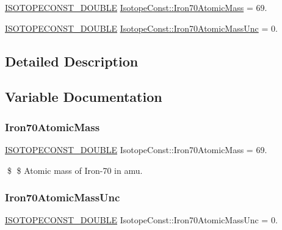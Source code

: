 \begin{DoxyCompactItemize}
\item 
\mbox{\hyperlink{group___isotope_const-_macros_ga8f45a7272ce02c0b4c65c44636ed719a}{I\+S\+O\+T\+O\+P\+E\+C\+O\+N\+S\+T\+\_\+\+D\+O\+U\+B\+LE}} \mbox{\hyperlink{group___isotope_const-_iron-_fe70_gac1929da1a5e26a3717f1ee7388b3af29}{Isotope\+Const\+::\+Iron70\+Atomic\+Mass}} = 69.
\item 
\mbox{\hyperlink{group___isotope_const-_macros_ga8f45a7272ce02c0b4c65c44636ed719a}{I\+S\+O\+T\+O\+P\+E\+C\+O\+N\+S\+T\+\_\+\+D\+O\+U\+B\+LE}} \mbox{\hyperlink{group___isotope_const-_iron-_fe70_gad8564794954d0011aedcecf90f879b61}{Isotope\+Const\+::\+Iron70\+Atomic\+Mass\+Unc}} = 0.
\end{DoxyCompactItemize}


\subsection{Detailed Description}


\subsection{Variable Documentation}
\mbox{\label{group___isotope_const-_iron-_fe70_gac1929da1a5e26a3717f1ee7388b3af29}} 
\subsubsection{\texorpdfstring{Iron70\+Atomic\+Mass}{Iron70AtomicMass}}
{\footnotesize\ttfamily \mbox{\hyperlink{group___isotope_const-_macros_ga8f45a7272ce02c0b4c65c44636ed719a}{I\+S\+O\+T\+O\+P\+E\+C\+O\+N\+S\+T\+\_\+\+D\+O\+U\+B\+LE}} Isotope\+Const\+::\+Iron70\+Atomic\+Mass = 69.}

\$ \$ Atomic mass of Iron-\/70 in amu. \mbox{\label{group___isotope_const-_iron-_fe70_gad8564794954d0011aedcecf90f879b61}} 
\subsubsection{\texorpdfstring{Iron70\+Atomic\+Mass\+Unc}{Iron70AtomicMassUnc}}
{\footnotesize\ttfamily \mbox{\hyperlink{group___isotope_const-_macros_ga8f45a7272ce02c0b4c65c44636ed719a}{I\+S\+O\+T\+O\+P\+E\+C\+O\+N\+S\+T\+\_\+\+D\+O\+U\+B\+LE}} Isotope\+Const\+::\+Iron70\+Atomic\+Mass\+Unc = 0.}


